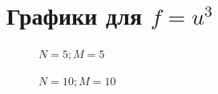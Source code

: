 \documentclass[12pt]{extarticle}
\numberwithin{equation}{section}
\begin{document}
\section{Графики для $f=u^3$} 
\begin{figure}[H]
\begin{minipage}[h]{0.43\linewidth}
 $N=5; M=5$ \\
\end{minipage}
\hfill
\begin{minipage}[h]{0.43\linewidth}
 $N=10; M=10$ \\
\end{minipage}
\end{figure}
\end{document}
